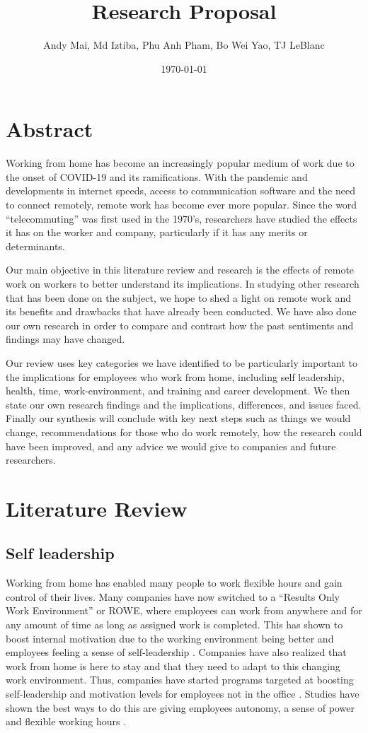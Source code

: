 \documentclass[12pt]{article}
\title{Research Proposal}
\author{Andy Mai, Md Iztiba, Phu Anh Pham, Bo Wei Yao, TJ LeBlanc}
\date{\today}
\begin{document}
\maketitle

\section*{Abstract}
Working from home has become an increasingly popular medium of work due to the onset of COVID-19 and its ramifications. With the pandemic and developments in internet speeds, access to communication software and the need to connect remotely, remote work has become ever more popular. Since the word “telecommuting” was first used in the 1970’s, researchers have studied the effects it has on the worker and company, particularly if it has any merits or determinants. 

Our main objective in this literature review and research is the effects of remote work on workers to better understand its implications. In studying other research that has been done on the subject, we hope to shed a light on remote work and its benefits and drawbacks that have already been conducted. We have also done our own research in order to compare and contrast how the past sentiments and findings may have changed. 

Our review uses key categories we have identified to be particularly important to the implications for employees who work from home, including self leadership, health, time, work-environment, and training and career development. We then state our own research findings and the implications, differences, and issues faced. Finally our synthesis will conclude with key next steps such as things we would change, recommendations for those who do work remotely, how the research could have been improved, and any advice we would give to companies and future researchers. 

\section*{Literature Review}

\subsection*{Self leadership}
Working from home has enabled many people to work flexible hours and gain control of their lives. Many companies have now switched to a “Results Only Work Environment” or ROWE, where employees can work from anywhere and for any amount of time as long as assigned work is completed. This has shown to boost internal motivation due to the working environment being better and employees feeling a sense of self-leadership \cite{Abdul}. Companies have also realized that work from home is here to stay and that they need to adapt to this changing work environment. Thus, companies have started programs targeted at boosting self-leadership and motivation levels for employees not in the office \cite{sultana2021exploring}. Studies have shown the best ways to do this are giving employees autonomy, a sense of power and flexible working hours \cite{sultana2021exploring}. 
 
\end{document}
